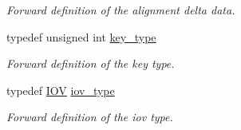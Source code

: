 \begin{DoxyCompactItemize}
\begin{DoxyCompactList}\small\item\em Forward definition of the alignment delta data. \item\end{DoxyCompactList}\item 
typedef unsigned int \hyperlink{class_d_d4hep_1_1_alignments_1_1_alignment_condition_a6ae3e6421b162cdd440b60d5a4e1ed92}{key\_\-type}
\begin{DoxyCompactList}\small\item\em Forward definition of the key type. \item\end{DoxyCompactList}\item 
typedef \hyperlink{class_d_d4hep_1_1_i_o_v}{IOV} \hyperlink{class_d_d4hep_1_1_alignments_1_1_alignment_condition_a95e1d25777aca1542555e477c8233968}{iov\_\-type}
\begin{DoxyCompactList}\small\item\em Forward definition of the iov type. \item\end{DoxyCompactList}\end{DoxyCompactItemize}
